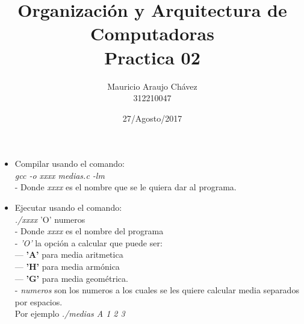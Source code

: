 \documentclass[a4paper,11pt]{article}
\title{Organización y Arquitectura de Computadoras\\Practica 02}
\author{Mauricio Araujo Chávez\\312210047}
\date{27/Agosto/2017}
\begin{document}
\maketitle
\begin{itemize}
  \item Compilar usando el comando: \\\textit{gcc -o xxxx medias.c -lm} \\ - Donde \textit{xxxx} es el nombre que se le quiera dar al programa.
\end{itemize}
\begin{itemize}
  \item Ejecutar usando el comando: \\\textit{./xxxx} 'O' numeros \\ - Donde \textit{xxxx} es el nombre del programa \\- \textit{'O'} la opción a calcular que puede ser:\\ --- \textbf{'A'} para media aritmetica \\--- \textbf{'H'} para media armónica \\--- \textbf{'G'} para media geométrica. \\ - \textit{numeros} son los numeros a los cuales se les quiere calcular media separados por espacios. \\ Por ejemplo \textit{./medias A 1 2 3}
\end{itemize}
\end{document}
